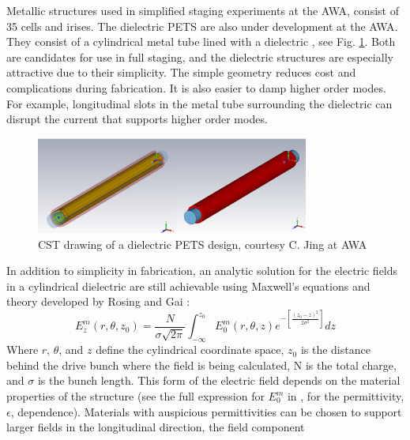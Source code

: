 Metallic structures used in simplified staging experiments at the AWA, consist of 35 cells and irises. 
The dielectric PETS are also under development at the AWA. 
They consist of a cylindrical metal tube lined with a dielectric \cite{PETSeq}, 
see Fig. \ref{fig:PETS}. Both are candidates for use in full staging, and 
the dielectric structures are especially attractive due to their simplicity. 
The simple geometry reduces cost and complications during fabrication.
It is also easier to damp higher order modes. For example, longitudinal slots in the metal tube surrounding
the dielectric can disrupt the current that supports higher order modes.   
\begin{figure}
	\begin{center}
		\includegraphics[width=0.8\textwidth]{images/pets-cst.png}
		\caption{CST drawing of a dielectric PETS design, courtesy C. Jing at AWA}
		\label{fig:PETS}
	\end{center}
\end{figure}
In addition to simplicity in fabrication, an analytic solution for the electric fields
in a cylindrical dielectric are still achievable using Maxwell's equations and theory developed
by Rosing and Gai \cite{RosingWei}:
\begin{equation}
E^m_z\left(r,\theta,z_0\right)= \frac{N}{\sigma \sqrt{2\pi}}\int_{-\infty}^{z_0}E^m_0\left(r,\theta,z\right)e^{-\left[\frac{\left(z_0-z\right)^2}{2\sigma^2}\right]}dz
\end{equation}
Where $r$, $\theta$, and $z$ define the cylindrical coordinate space, 
$z_0$ is the distance behind the drive bunch where the field is being calculated, 
N is the total charge, and $\sigma$ is the bunch length.
This form of the electric field depends on the material properties of the structure
(see the full expression for $E_0^m$ in \cite{RosingWei}, for the permittivity, $\epsilon$, dependence).   
Materials with auspicious permittivities can be chosen to support larger fields
in the longitudinal direction, the field component 
